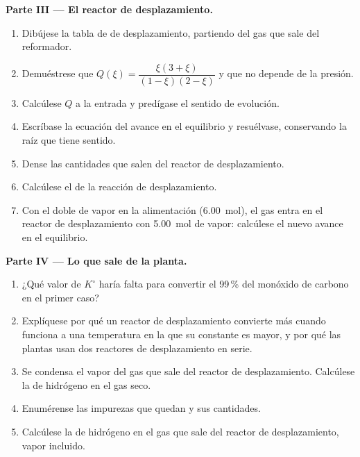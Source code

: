 \begin{problem}
\medskip
\noindent\textbf{Parte III --- El reactor de desplazamiento.}
\begin{enumerate}[resume]
  \item Dibújese la tabla de  de desplazamiento,
        partiendo del gas que sale del reformador.
  \item Demuéstrese que $Q(\xi) = \dfrac{\xi(3 + \xi)}{(1 - \xi)(2 - \xi)}$
        y que no depende de la presión.
  \item Calcúlese $Q$ a la entrada y predígase el sentido de evolución.
  \item Escríbase la ecuación del avance en el equilibrio y resuélvase,
        conservando la raíz que tiene sentido.
  \item Dense las cantidades que salen del reactor de desplazamiento.
  \item Calcúlese el  de la reacción de
        desplazamiento.
  \item Con el doble de vapor en la alimentación (\qty{6.00}{mol}), el gas
        entra en el reactor de desplazamiento con \qty{5.00}{mol} de
        vapor: calcúlese el nuevo avance en el equilibrio.
\end{enumerate}

\medskip
\noindent\textbf{Parte IV --- Lo que sale de la planta.}
\begin{enumerate}[resume]
  \item ¿Qué valor de $K^\circ$ haría falta para convertir el 99\,\% del
        monóxido de carbono en el primer caso?
  \item Explíquese por qué un reactor de desplazamiento convierte más
        cuando funciona a una temperatura en la que su constante es
        mayor, y por qué las plantas usan dos reactores de desplazamiento
        en serie.
  \item Se condensa el vapor del gas que sale del reactor de
        desplazamiento. Calcúlese la  de hidrógeno en el gas
        seco.
  \item Enumérense las impurezas que quedan y sus cantidades.
  \item Calcúlese la  de hidrógeno en el gas que sale del
        reactor de desplazamiento, vapor incluido.
\end{enumerate}
\end{problem}
